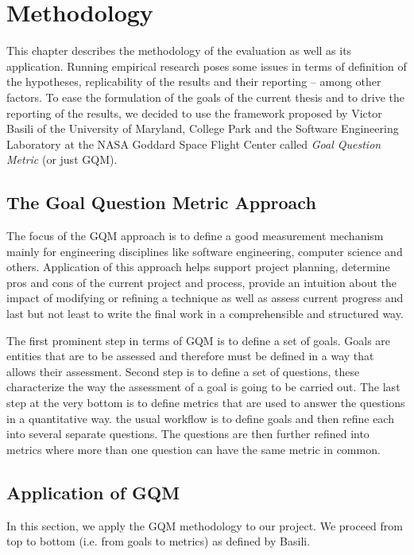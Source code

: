 \chapter{Methodology}

This chapter describes the methodology of the evaluation as well as its application. Running empirical research poses some issues in terms of definition of the hypotheses, replicability of the results and their reporting -- among other factors. To ease the formulation of the goals of the current thesis and to drive the reporting of the results, we decided to use the framework proposed by Victor Basili of the University of Maryland, College Park and the Software Engineering Laboratory at the NASA Goddard Space Flight Center called \textit{Goal Question Metric} (or just GQM).

\section{The Goal Question Metric Approach}

The focus of the GQM approach is to define a good measurement mechanism mainly for engineering disciplines like software engineering, computer science and others. Application of this approach helps support project planning, determine pros and cons of the current project and process, provide an intuition about the impact of modifying or refining a technique as well as assess current progress and last but not least to write the final work in a comprehensible and structured way.

The first prominent step in terms of GQM is to define a set of goals. Goals are entities that are to be assessed and therefore must be defined in a way that allows their assessment. Second step is to define a set of questions, these characterize the way the assessment of a goal is going to be carried out. The last step at the very bottom is to define metrics that are used to answer the questions in a quantitative way. the usual workflow is to define goals and then refine each into several separate questions. The questions are then further refined into metrics where more than one question can have the same metric in common.

\section{Application of GQM}

In this section, we apply the GQM methodology to our project. We proceed from top to bottom (i.e. from goals to metrics) as defined by Basili.

